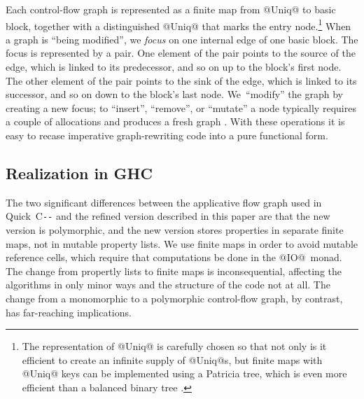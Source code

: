 \documentclass[blockstyle,preprint,nocopyrightspace]{sigplanconf}
\let\cite\citep
\newcommand\PAL{\mbox{C{\texttt{-{}-}}}}
\begin{document}
Each control-flow graph is represented as a finite map from @Uniq@ to
basic block, together with a distinguished @Uniq@ that marks the entry
node.\footnote
{The representation of @Uniq@ is carefully chosen so that not only is
  it efficient to create an infinite supply of @Uniq@s, but finite
  maps with @Uniq@ keys can be implemented using a Patricia tree,
  which is even more efficient than a balanced binary tree
  \cite{okasaki-gill:integer-map,adams:balancing-act}.} 
When a graph is ``being modified'',
we \emph{focus} on one internal edge of one basic block.
The focus is represented by a pair.
One element of the pair points to the
source of the edge, which is linked to its predecessor, and so on up
to the block's first node.
The other element of the pair points to the
sink of the edge, which is linked to its successor, and so on down
to the block's last node.
We~``modify'' the graph by creating a new focus; to ``insert'',
``remove'', or ``mutate'' a node typically requires a couple of
allocations and produces a fresh graph
\cite{dias-ramsey:applicative-flow-graph}. 
With these operations it is easy to recase imperative graph-rewriting
code into a pure functional form.

\subsection{Realization in GHC}

The two significant differences between the applicative flow graph
used in Quick~{\PAL} \cite{dias-ramsey:applicative-flow-graph} and the
refined version described in this paper are that the new version is
polymorphic, and the new version stores properties in separate finite
maps, not in mutable property lists.
We use finite maps in order to avoid mutable reference cells, which
require that computations be done in the @IO@~monad.
The change from propertly lists to finite maps is inconsequential,
affecting the algorithms in only minor ways and the structure of the
code not at all.
The change from a monomorphic to a polymorphic control-flow graph, by
contrast, has far-reaching implications.
\end{document}
